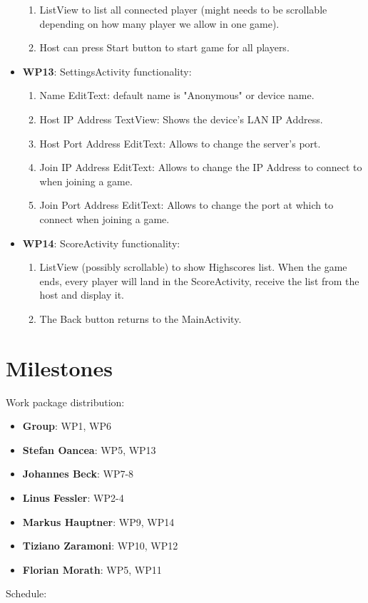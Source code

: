 \documentclass{report}
\begin{document}
\begin{itemize}
\begin{enumerate}
			\item ListView to list all connected player (might needs to be scrollable depending on how many player we allow in one game).
			\item Host can press Start button to start game for all players.
		\end{enumerate}
	\item {\bf WP13}: SettingsActivity functionality:
		\begin{enumerate}
			\item Name EditText: default name is "Anonymous" or device name.
			\item Host IP Address TextView: Shows the device's LAN IP Address.
			\item Host Port Address EditText: Allows to change the server's port.
			\item Join IP Address EditText: Allows to change the IP Address to connect to when joining a game.
			\item Join Port Address EditText: Allows to change the port at which to connect when joining a game.
		\end{enumerate}
	\item {\bf WP14}: ScoreActivity functionality:
		\begin{enumerate}
			\item ListView (possibly scrollable) to show Highscores list. When the game ends, every player will land in the ScoreActivity, receive the list from the host and display it.
			\item The Back button returns to the MainActivity.
		\end{enumerate}
\end{itemize}

\section{Milestones}


Work package distribution: 
\begin{itemize}	
	\item{\bf Group}: WP1, WP6
	\item {\bf Stefan Oancea}: WP5, WP13
	\item {\bf Johannes Beck}: WP7-8
	\item {\bf Linus Fessler}: WP2-4
	\item {\bf Markus Hauptner}: WP9, WP14
	\item {\bf Tiziano Zaramoni}: WP10, WP12
	\item {\bf Florian Morath}: WP5, WP11
\end{itemize}
Schedule:
\end{document}
